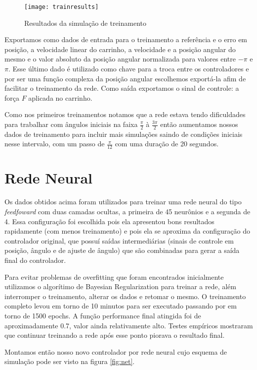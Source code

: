 \documentclass{article}
\begin{document}
\begin{figure}[H]
	\centering
	\texttt{[image: trainresults]}
	\caption{Resultados da simulação de treinamento}
	\label{fig:trainresults}
\end{figure}


Exportamos como dados de entrada para o treinamento a referência e o erro em posição, a velocidade linear do carrinho, a velocidade e a posição angular do mesmo e o valor absoluto da posição angular normalizada para valores entre $-\pi$ e $\pi$. Esse último dado é utilizado como chave para a troca entre os controladores e por ser uma função complexa da posição angular escolhemos exportá-la afim de facilitar o treinamento da rede.
Como saída exportamos o sinal de controle: a força $F$ aplicada no carrinho.

Como nos primeiros treinamentos notamos que a rede estava tendo dificuldades para trabalhar com ângulos iniciais na faixa $\frac{\pi}{2}$ à $\frac{3\pi}{2}$ então aumentamos nossos dados de treinamento para incluir mais simulações saindo de condições iniciais nesse intervalo, com um passo de $\frac{\pi}{12}$ com uma duração de 20 segundos.

\section{Rede Neural}

Os dados obtidos acima foram utilizados para treinar uma rede neural do tipo \textit{feedfoward} com duas camadas ocultas, a primeira de 45 neurônios e a segunda de 4. Essa configuração foi escolhida pois ela apresentou bons resultados rapidamente (com menos treinamento) e pois ela se aproxima da configuração do controlador original, que possuí saídas intermediárias (sinais de controle em posição, ângulo e de ajuste de ângulo) que são combinadas para gerar a saída final do controlador.

Para evitar problemas de overfitting que foram encontrados inicialmente utilizamos o algorítimo de Bayesian Regularization para treinar a rede, além interromper o treinamento, alterar os dados e retomar o mesmo. O treinamento completo levou em torno de 10 minutos para ser executado passando por em torno de 1500 epochs. A função performance final atingida foi de aproximadamente 0.7, valor ainda relativamente alto. Testes empíricos mostraram que continuar treinando a rede após esse ponto piorava o resultado final.

Montamos então nosso novo controlador por rede neural cujo esquema de simulação pode ser visto na figura \ref{fig:net}.
\end{document}
